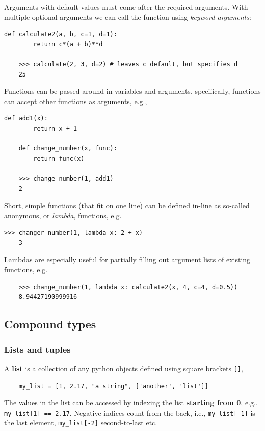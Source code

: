 \documentclass{article}
\begin{document}
Arguments with default values must come after the required arguments. With multiple optional arguments we can call the function using \emph{keyword arguments}:
\begin{lstlisting}[caption=Optional and keyword arguments.]
    def calculate2(a, b, c=1, d=1):
        return c*(a + b)**d

    >>> calculate(2, 3, d=2) # leaves c default, but specifies d
    25
\end{lstlisting}

Functions can be passed around in variables and arguments, specifically, functions can accept other functions as arguments, e.g.,
\begin{lstlisting}[caption=Higher order functions.]
    def add1(x):
        return x + 1

    def change_number(x, func):
        return func(x)

    >>> change_number(1, add1)
    2
\end{lstlisting}

Short, simple functions (that fit on one line) can be defined in-line as so-called anonymous, or \emph{lambda}, functions, e.g.
\begin{lstlisting}[caption=Lambda functions.]
    >>> changer_number(1, lambda x: 2 + x)
    3
\end{lstlisting}
Lambdas are especially useful for partially filling out argument lists of existing functions, e.g.
\begin{lstlisting}
    >>> change_number(1, lambda x: calculate2(x, 4, c=4, d=0.5))
    8.94427190999916
\end{lstlisting}

\subsection{Compound types}

\subsubsection{Lists and tuples}
A \textbf{list} is a collection of any python objects defined using square brackets \verb|[]|,
\begin{lstlisting}
    my_list = [1, 2.17, "a string", ['another', 'list']]
\end{lstlisting}
The values in the list can be accessed by indexing the list \textbf{starting from 0}, e.g., \verb|my_list[1] == 2.17|. Negative indices count from the back, i.e., \verb|my_list[-1]| is the last element, \verb|my_list[-2]| second-to-last etc.
\end{document}
